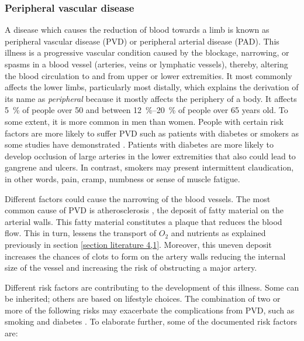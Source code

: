 \subsubsection{Peripheral vascular disease}
\label{section literature 2.1}
A disease which causes the reduction of blood towards a limb is known as peripheral vascular disease (PVD) or peripheral arterial disease (PAD). This illness is a progressive vascular condition caused by the blockage, narrowing, or spasms in a blood vessel (arteries, veins or lymphatic vessels), thereby, altering the blood circulation to and from upper or lower extremities.  It most commonly affects the lower limbs, particularly most distally, which explains the derivation of its name as \textit{peripheral} because it mostly affects the periphery of a body. It affects \SI{5}{\percent} of people over \num{50} and between \SIrange{12}{20}{\percent} of people over 65 years old. To some extent, it is more common in men than women. People with certain risk factors are more likely to suffer PVD such as patients with diabetes or smokers as some studies have demonstrated \cite{kannel1979diabetes,janka1980peripheral, menzoian1989symptomatology, eliasson2003cigarette, stephens2004cardiovascular}. Patients with diabetes are more likely to develop occlusion of large arteries in the lower extremities that also could lead to gangrene and ulcers. In contrast, smokers may present intermittent claudication, in other words, pain, cramp, numbness or sense of muscle fatigue. 

Different factors could cause the narrowing of the blood vessels. The most common cause of PVD is atherosclerosis \cite{nichols2011mcdonald}, the deposit of fatty material on the arterial walls. This fatty material constitutes a plaque that reduces the blood flow. This in turn, lessens the transport of $O_2$ and nutrients as explained previously in section \ref{section literature 4,1}. Moreover, this uneven deposit increases the chances of clots to form on the artery walls reducing the internal size of the vessel and increasing the risk of obstructing a major artery.

Different risk factors are contributing to the development of this illness. Some can be inherited; others are based on lifestyle choices. The combination of two or more of the following risks may exacerbate the complications from PVD, such as smoking and diabetes \cite{kannel1979diabetes, janka1980peripheral, stephens2004cardiovascular}. To elaborate further, some of the documented risk factors are:

